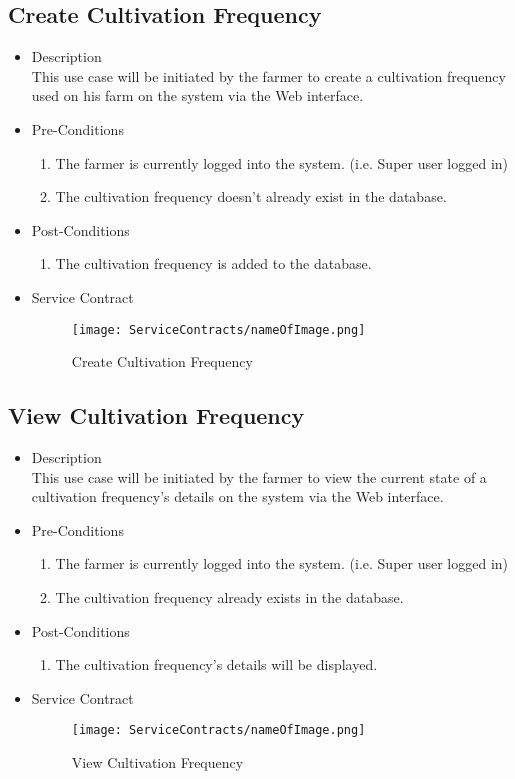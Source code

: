 \documentclass[11pt,fleqn]{book} %
\begin{document}
\subsection{Create Cultivation Frequency}
\begin{itemize}
	\item Description\\
	This use case will be initiated by the farmer to create a cultivation frequency used on his farm on the system via the Web interface.
	\item Pre-Conditions
	\begin{enumerate}
		\item The farmer is currently logged into the system. (i.e. Super user logged in)
		\item The cultivation frequency doesn’t already exist in the database. 				
	\end{enumerate}
	\item Post-Conditions
	\begin{enumerate}
		\item The cultivation frequency is added to the database.
	\end{enumerate}
	\item Service Contract
	\begin{figure}
		\texttt{[image: ServiceContracts/nameOfImage.png]}
		\caption{Create Cultivation Frequency}
	\end{figure}
\end{itemize}

\subsection{View Cultivation Frequency}
\begin{itemize}
	\item Description\\
	This use case will be initiated by the farmer to view the current state of a cultivation frequency’s details on the system via the Web interface.
	\item Pre-Conditions
	\begin{enumerate}
		\item The farmer is currently logged into the system. (i.e. Super user logged in)
		\item The cultivation frequency already exists in the database.		
	\end{enumerate}
	\item Post-Conditions
	\begin{enumerate}
		\item The cultivation frequency’s details will be displayed.
	\end{enumerate}
	\item Service Contract
	\begin{figure}
		\texttt{[image: ServiceContracts/nameOfImage.png]}
		\caption{View Cultivation Frequency}
	\end{figure}
\end{itemize}
\end{document}
